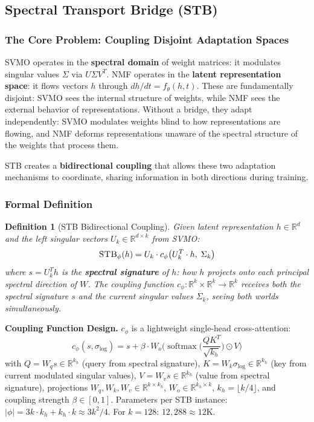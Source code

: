 \documentclass{scpe}
\newtheorem{definition}[theorem]{Definition}
\newcommand{\stb}{\textsc{STB}}
\newcommand{\RR}{\mathbb{R}}
\newcommand{\softmax}{\operatorname{softmax}}
\begin{document}
\subsection{Spectral Transport Bridge (\stb)}
\label{sec:stb}

\subsubsection{The Core Problem: Coupling Disjoint Adaptation Spaces}

SVMO operates in the \textbf{spectral domain} of weight matrices: it modulates singular values $\Sigma$ via $U\Sigma V^T$. NMF operates in the \textbf{latent representation space}: it flows vectors $h$ through $dh/dt = f_\theta(h, t)$. These are fundamentally disjoint: SVMO sees the internal structure of weights, while NMF sees the external behavior of representations. Without a bridge, they adapt independently: SVMO modulates weights blind to how representations are flowing, and NMF deforms representations unaware of the spectral structure of the weights that process them.

STB creates a \textbf{bidirectional coupling} that allows these two adaptation mechanisms to coordinate, sharing information in both directions during training.

\subsubsection{Formal Definition}

\begin{definition}[\stb{} Bidirectional Coupling]
Given latent representation $h \in \RR^d$ and the left singular vectors $U_k \in \RR^{d \times k}$ from SVMO:
\begin{equation}
\text{\stb}_\phi(h) = U_k \cdot c_\phi\big(U_k^T \cdot h,\; \Sigma_k\big)
\end{equation}
where $s = U_k^T h$ is the \textbf{spectral signature} of $h$: how $h$ projects onto each principal spectral direction of $W$. The coupling function $c_\phi: \RR^k \times \RR^k \to \RR^k$ receives \textit{both} the spectral signature $s$ and the current singular values $\Sigma_k$, seeing both worlds simultaneously.
\end{definition}

\textbf{Coupling Function Design.} $c_\phi$ is a lightweight single-head cross-attention:
\begin{equation}
c_\phi(s, \sigma_{\log}) = s + \beta \cdot W_o\!\big(\softmax\!\big(\frac{Q K^T}{\sqrt{k_h}}\big) \odot V\big)
\end{equation}
with $Q = W_q s \in \RR^{k_h}$ (query from spectral signature), $K = W_k \sigma_{\log} \in \RR^{k_h}$ (key from current modulated singular values), $V = W_v s \in \RR^{k_h}$ (value from spectral signature), projections $W_q, W_k, W_v \in \RR^{k \times k_h}$, $W_o \in \RR^{k_h \times k}$, $k_h = \lfloor k/4 \rfloor$, and coupling strength $\beta \in [0,1]$. Parameters per STB instance: $|\phi| = 3k \cdot k_h + k_h \cdot k \approx 3k^2/4$. For $k=128$: $12{,}288 \approx 12\text{K}$.
\end{document}

